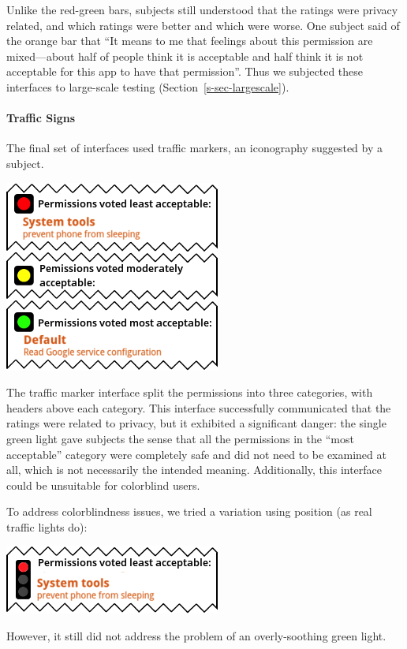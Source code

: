 \documentclass[11pt]{article}
\newcommand{\refsec}[1]{Section~\ref{#1}}
\begin{document}
Unlike the red-green
bars, subjects still understood that the ratings were privacy related, and 
which ratings were better and which were worse. One subject
said of the orange bar that ``It means to me that feelings about 
this permission are mixed---about half of people think 
it is acceptable and half think it is not 
acceptable for this app to have that permission''. Thus we
subjected these interfaces to large-scale testing (\refsec{s-sec-largescale}). 

\paragraph{Traffic Signs}
\label{s-sec-traffic}

The final set of interfaces used traffic markers, 
an iconography suggested by a subject.

\label{ss-sec-traffic-r2}
\begin{center}
\includegraphics[width=.5\linewidth]{candidate-img/traffic/trafficR2.png}
\end{center}

The traffic marker interface split the permissions into three categories, with headers above
each category.
This interface successfully communicated that the ratings were related to privacy, 
but it exhibited a significant danger: the single green light gave subjects
the sense that all the permissions in the ``most acceptable'' category were 
completely safe and did
not need to be examined at all, which is not necessarily the
intended meaning. Additionally, this interface 
could be unsuitable for colorblind users.

To address colorblindness issues, we tried a variation using position
(as real traffic lights do):
\label{ss-sec-traffic-r3}
\begin{center}
\includegraphics[width=.5\linewidth]{candidate-img/traffic/trafficR3.png}
\end{center}
However, it still did not address
the problem of an overly-soothing green light. 
\end{document}
